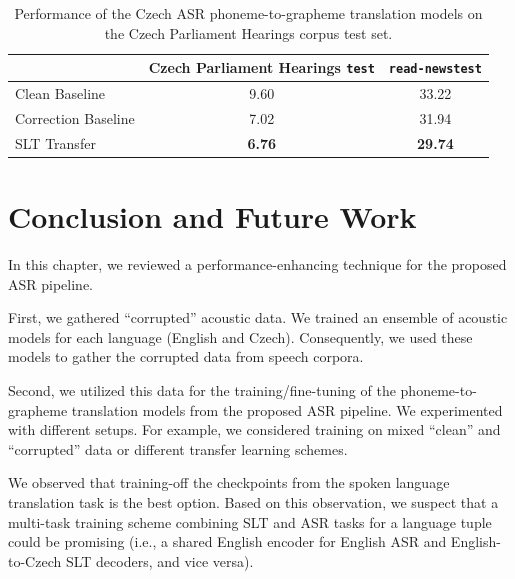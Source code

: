 \begin{table}[t]
	\centering
	\begin{tabular}{l|cc}
		&  Czech Parliament Hearings \texttt{test} & \texttt{read-newstest} \\ \midrule
		Clean Baseline             & 9.60       &     33.22         \\
		
		Correction Baseline             & 7.02   & 31.94           \\
		
		SLT Transfer     & \textbf{6.76}   & \textbf{29.74}  \\
	\end{tabular}   
	\caption[Czech finetuned ASR performance evaluation]{Performance of the Czech ASR phoneme-to-grapheme translation models on the Czech Parliament Hearings corpus test set.}
	\label{tab:werstrain_cs}
\end{table}


\section{Conclusion and Future Work}
In this chapter, we reviewed a performance-enhancing technique for the proposed ASR pipeline.

First, we gathered ``corrupted'' acoustic data. We trained an ensemble of acoustic models for each language (English and Czech). Consequently, we used these models to gather the corrupted data from speech corpora.

Second, we utilized this data for the training/fine-tuning of the phoneme-to-gra\-pheme translation models from the proposed ASR pipeline. We experimented with different setups. For example, we considered training on mixed ``clean'' and ``corrupted'' data or different transfer learning schemes.

We observed that training-off the checkpoints from the spoken language translation task is the best option. Based on this observation, we suspect that a multi-task training scheme combining SLT and ASR tasks for a language tuple could be promising (i.e., a shared English encoder for English ASR and English-to-Czech SLT decoders, and vice versa).

